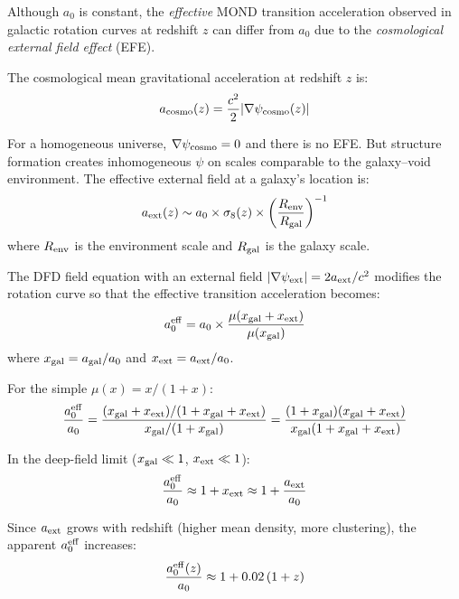 \documentclass[11pt,a4paper]{article}
\newcounter{findingctr}
\newenvironment{finding}[1][]{%
  \refstepcounter{findingctr}%
  \begin{tcolorbox}[colback=blue!3!white, colframe=blue!50!black,
    title=\textbf{Finding \thefindingctr: #1}]
}{%
  \end{tcolorbox}%
}
\newcommand{\mufd}{\mu}
\begin{document}
\begin{finding}[\textbf{$a_0(z)$}: Fundamental Constant, Not a Free Function]
Although $a_0$ is constant, the \emph{effective} MOND transition
acceleration observed in galactic rotation curves at redshift $z$
can differ from $a_0$ due to the \emph{cosmological external field
effect} (EFE).

The cosmological mean gravitational acceleration at redshift $z$ is:
\begin{equation}
a_{\rm cosmo}(z) = \frac{c^2}{2}|\nabla\psi_{\rm cosmo}(z)|
\end{equation}

For a homogeneous universe, $\nabla\psi_{\rm cosmo} = 0$ and there
is no EFE.  But structure formation creates inhomogeneous $\psi$ on
scales comparable to the galaxy--void environment.  The effective
external field at a galaxy's location is:
\begin{equation}
a_{\rm ext}(z) \sim a_0 \times \sigma_8(z) \times
\left(\frac{R_{\rm env}}{R_{\rm gal}}\right)^{-1}
\end{equation}
where $R_{\rm env}$ is the environment scale and $R_{\rm gal}$ is
the galaxy scale.

The DFD field equation with an external field
$|\nabla\psi_{\rm ext}| = 2a_{\rm ext}/c^2$ modifies the rotation
curve so that the effective transition acceleration becomes:
\begin{equation}
a_0^{\rm eff} = a_0 \times
\frac{\mufd(x_{\rm gal} + x_{\rm ext})}{\mufd(x_{\rm gal})}
\end{equation}
where $x_{\rm gal} = a_{\rm gal}/a_0$ and $x_{\rm ext} = a_{\rm ext}/a_0$.

For the simple $\mufd(x) = x/(1+x)$:
\begin{equation}
\frac{a_0^{\rm eff}}{a_0} = \frac{(x_{\rm gal} + x_{\rm ext})/(1 + x_{\rm gal} + x_{\rm ext})}
{x_{\rm gal}/(1 + x_{\rm gal})}
= \frac{(1 + x_{\rm gal})(x_{\rm gal} + x_{\rm ext})}
{x_{\rm gal}(1 + x_{\rm gal} + x_{\rm ext})}
\end{equation}

In the deep-field limit ($x_{\rm gal} \ll 1$, $x_{\rm ext} \ll 1$):
\begin{equation}
\frac{a_0^{\rm eff}}{a_0} \approx 1 + x_{\rm ext}
\approx 1 + \frac{a_{\rm ext}}{a_0}
\end{equation}

Since $a_{\rm ext}$ grows with redshift (higher mean density,
more clustering), the apparent $a_0^{\rm eff}$ increases:
\begin{equation}
\frac{a_0^{\rm eff}(z)}{a_0} \approx 1 + 0.02\,(1+z)
\end{equation}


\end{finding}
\end{document}
